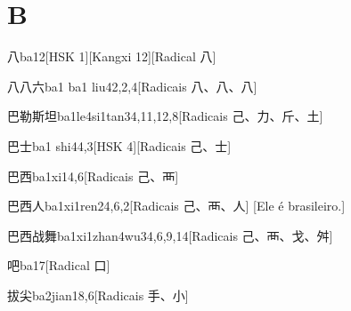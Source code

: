 
\section*{B}

\begin{entry}{八}{ba1}{2}[HSK 1][Kangxi 12][Radical ⼋]
\end{entry}

\begin{entry}{八八六}{ba1 ba1 liu4}{2,2,4}[Radicais ⼋、⼋、⼋]
\end{entry}

\begin{entry}{巴勒斯坦}{ba1le4si1tan3}{4,11,12,8}[Radicais ⼰、⼒、⽄、⼟]
\end{entry}

\begin{entry}{巴士}{ba1 shi4}{4,3}[HSK 4][Radicais ⼰、⼠]
\end{entry}

\begin{entry}{巴西}{ba1xi1}{4,6}[Radicais ⼰、⾑]
\end{entry}

\begin{entry}{巴西人}{ba1xi1ren2}{4,6,2}[Radicais ⼰、⾑、⼈]
  [Ele é brasileiro.]
\end{entry}

\begin{entry}{巴西战舞}{ba1xi1zhan4wu3}{4,6,9,14}[Radicais ⼰、⾑、⼽、⾇]
\end{entry}

\begin{entry}{吧}{ba1}{7}[Radical ⼝]
\end{entry}

\begin{entry}{拔尖}{ba2jian1}{8,6}[Radicais ⼿、⼩]
\end{entry}

